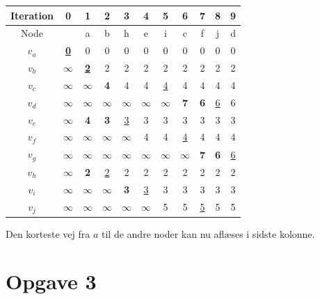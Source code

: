 \documentclass[a4paper]{article}
\begin{document}
\begin{center}
\begin{tabular}{|c|c|c|c|c|c|c|c|c|c|c|}
\hline 
\textbf{Iteration} & 0 & 1 & 2 & 3 & 4 & 5 & 6 & 7 & 8 & 9 \\ 
\hline 
Node &  & a & b & h & e & i & c & f & j & d \\ 
\hline 
$v_a$ & \textbf{\underline{0}} & 0 & 0 & 0 & 0 & 0 & 0 & 0 & 0 & 0 \\ 
\hline 
$v_b$ & $\infty$ & \textbf{\underline{2}} & 2 & 2 & 2& 2 & 2 & 2 & 2 & 2\\ 
\hline 
$v_c$ & $\infty$ & $\infty$ & \textbf{4} & 4 & 4 & \underline{4} & 4 & 4 & 4 & 4\\ 
\hline 
$v_d$ & $\infty$ & $\infty$ & $\infty$ & $\infty$ & $\infty$ & $\infty$ & \textbf{7} & \textbf{6} & \underline{6} & 6 \\ 
\hline 
$v_e$ & $\infty$ & \textbf{4} & \textbf{3} & \underline{3} & 3 & 3 & 3 & 3 & 3 & 3 \\ 
\hline 
$v_f$ & $\infty$ & $\infty$ & $\infty$ & $\infty$ & 4 & 4 & \underline{4} & 4 & 4 & 4 \\ 
\hline 
$v_g$ & $\infty$ & $\infty$ & $\infty$ & $\infty$ & $\infty$ & $\infty$ & $\infty$ & \textbf{7} & \textbf{6} & \underline{6} \\ 
\hline 
$v_h$ & $\infty$ & \textbf{2} & \underline{2} & 2 & 2 & 2 & 2 & 2 & 2 & 2 \\ 
\hline
$v_i$ & $\infty$ & $\infty$ & $\infty$ & \textbf{3} & \underline{3} & 3 & 3 & 3 & 3 & 3\\ 
\hline 
$v_j$ & $\infty$ & $\infty$ & $\infty$ & $\infty$ & $\infty$ & 5 & 5 & \underline{5} & 5 & 5 \\ 
\hline 
\end{tabular} 
\end{center}
Den korteste vej fra $a$ til de andre noder kan nu aflæses i sidste kolonne.

\newpage
\section*{Opgave 3}
\end{document}
